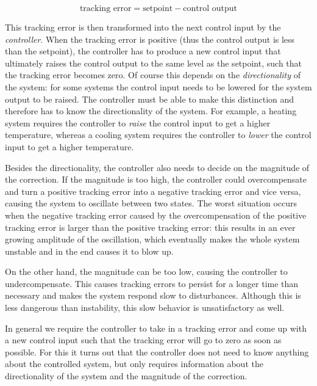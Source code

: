 \begin{equation} \label{eq:tracking-error}
\text{tracking error} = \text{setpoint} - \text{control output}
\end{equation}

This tracking error is then transformed into the next control input by the \textit{controller}. When the tracking error is positive (thus the control output is less than the setpoint), the controller has to produce a new control input that ultimately raises the control output to the same level as the setpoint, such that the tracking error becomes zero. Of course this depends on the \textit{directionality} of the system: for some systems the control input needs to be lowered for the system output to be raised. The controller must be able to make this distinction and therefore has to know the directionality of the system. For example, a heating system requires the controller to \emph{raise} the control input to get a higher temperature, whereas a cooling system requires the controller to \emph{lower} the control input to get a higher temperature.

Besides the directionality, the controller also needs to decide on the magnitude of the correction. If the magnitude is too high, the controller could overcompensate and turn a positive tracking error into a negative tracking error and vice versa, causing the system to oscillate between two states. The worst situation occurs when the negative tracking error caused by the overcompensation of the positive tracking error is larger than the positive tracking error: this results in an ever growing amplitude of the oscillation, which eventually makes the whole system unstable and in the end causes it to blow up.

On the other hand, the magnitude can be too low, causing the controller to undercompensate. This causes tracking errors to persist for a longer time than necessary and makes the system respond slow to disturbances. Although this is less dangerous than instability, this slow behavior is unsatisfactory as well.

In general we require the controller to take in a tracking error and come up with a new control input such that the tracking error will go to zero as soon as possible. For this it turns out that the controller does not need to know anything about the controlled system, but only requires information about the directionality of the system and the magnitude of the correction.

